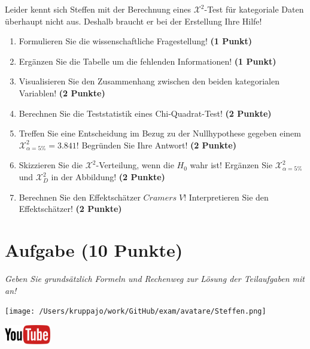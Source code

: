 \documentclass[a4paper, 9pt]{scrartcl}\usepackage[]{graphicx}\usepackage[]{xcolor}
\begin{document}
\vspace{5Ex}

Leider kennt sich Steffen mit der Berechnung eines $\mathcal{X}^2$-Test für kategoriale Daten überhaupt nicht aus. Deshalb braucht er bei der Erstellung Ihre Hilfe!

\begin{enumerate}
\item Formulieren Sie die wissenschaftliche Fragestellung! \textbf{(1 Punkt)}
\item Ergänzen Sie die Tabelle um die fehlenden Informationen! \textbf{(1 Punkt)} 
\item Visualisieren Sie den Zusammenhang zwischen den beiden kategorialen Variablen! \textbf{(2 Punkte)}
\item Berechnen Sie die Teststatistik eines Chi-Quadrat-Test! \textbf{(2 Punkte)}
\item Treffen Sie eine Entscheidung im Bezug zu der Nullhypothese gegeben
  einem $\mathcal{X}^2_{\alpha = 5\%} = 3.841$! Begründen Sie Ihre Antwort!
  \textbf{(2 Punkte)}
\item Skizzieren Sie die $\mathcal{X}^2$-Verteilung, wenn die $H_0$ wahr ist! Ergänzen Sie  $\mathcal{X}^2_{\alpha = 5\%}$ und $\mathcal{X}^2_{D}$ in der Abbildung! \textbf{(2 Punkte)}
\item Berechnen Sie den Effektschätzer $Cramers\; V$! Interpretieren Sie den
  Effektschätzer! \textbf{(2 Punkte)}
\end{enumerate} 
\clearpage

\section{Aufgabe \hfill (10 Punkte)}

\textit{Geben Sie grundsätzlich Formeln und Rechenweg zur Lösung der Teilaufgaben mit an!} \\[1Ex]
 

 
\begin{minipage}[t]{0.5\textwidth}
\texttt{[image: /Users/kruppajo/work/GitHub/exam/avatare/Steffen.png]}
\end{minipage}
\begin{minipage}[t]{0.5\textwidth}
\hfill
\href{https://youtu.be/jakM7fHyZfU}{\includegraphics[width = 2cm]{img/youtube}}\\[1Ex]
\end{minipage}
\vspace{1ex}
\end{document}
